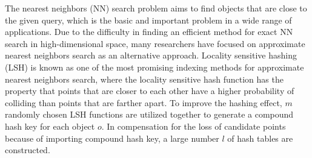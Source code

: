 

The nearest neighbors (NN) search problem aims to find objects that are close to the given query, which is the basic and important problem in a wide range of applications. Due to the difficulty in finding an efficient method for exact NN search in high-dimensional space, many researchers have focused on approximate nearest neighbors search as an alternative approach. Locality sensitive hashing (LSH) \cite{orilsh} is known as one of the most promising indexing methods for approximate nearest neighbors search, where the locality sensitive hash function has the property that points that are closer to each other have a higher probability of colliding than points that are farther apart. To improve the hashing effect, $m$ randomly chosen LSH functions are utilized together to generate a compound hash key for each object $o$. In compensation for the loss of candidate points because of importing compound hash key, a large number $l$ of hash tables are constructed.

